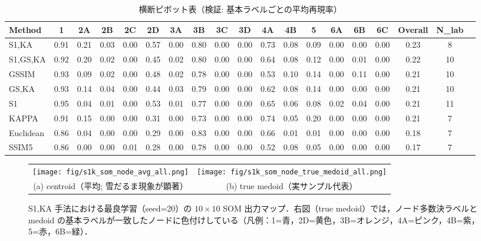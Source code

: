 \documentclass{jarticle}
\theoremstyle{definition}
\begin{document}
\begin{table*}[t!]
\centering
\caption{横断ピボット表（検証: 基本ラベルごとの平均再現率）}
\label{tab:pivot_valid}
\scriptsize
\setlength{\tabcolsep}{3pt}
\begin{tabular}{lcccccccccccccccccc}
\hline
Method & 1 & 2A & 2B & 2C & 2D & 3A & 3B & 3C & 3D & 4A & 4B & 5 & 6A & 6B & 6C & Overall & N\_lab \\
\hline
S1,KA      & 0.91 & 0.21 & 0.03 & 0.00 & 0.57 & 0.00 & 0.80 & 0.00 & 0.00 & 0.73 & 0.08 & 0.09 & 0.00 & 0.00 & 0.00 & 0.23 & 8 \\
S1,GS,KA   & 0.92 & 0.20 & 0.02 & 0.00 & 0.45 & 0.02 & 0.80 & 0.00 & 0.00 & 0.64 & 0.08 & 0.12 & 0.00 & 0.01 & 0.00 & 0.22 & 10 \\
GSSIM      & 0.93 & 0.09 & 0.02 & 0.00 & 0.48 & 0.02 & 0.78 & 0.00 & 0.00 & 0.53 & 0.10 & 0.14 & 0.00 & 0.11 & 0.00 & 0.21 & 10 \\
GS,KA      & 0.93 & 0.14 & 0.04 & 0.00 & 0.44 & 0.03 & 0.79 & 0.00 & 0.00 & 0.62 & 0.08 & 0.14 & 0.00 & 0.00 & 0.00 & 0.21 & 10 \\
S1         & 0.95 & 0.04 & 0.01 & 0.00 & 0.53 & 0.01 & 0.77 & 0.00 & 0.00 & 0.65 & 0.06 & 0.08 & 0.02 & 0.04 & 0.00 & 0.21 & 11 \\
KAPPA      & 0.91 & 0.15 & 0.00 & 0.00 & 0.31 & 0.00 & 0.73 & 0.00 & 0.00 & 0.74 & 0.05 & 0.20 & 0.00 & 0.00 & 0.00 & 0.21 & 7 \\
Euclidean  & 0.86 & 0.04 & 0.00 & 0.00 & 0.29 & 0.00 & 0.83 & 0.00 & 0.00 & 0.66 & 0.01 & 0.01 & 0.00 & 0.00 & 0.00 & 0.18 & 7 \\
SSIM5      & 0.86 & 0.00 & 0.00 & 0.01 & 0.28 & 0.00 & 0.78 & 0.00 & 0.00 & 0.52 & 0.08 & 0.05 & 0.00 & 0.00 & 0.00 & 0.17 & 7 \\
\hline
\end{tabular}
\end{table*}

\begin{figure*}[t!]
\centering
\begin{tabular}{cc}
\texttt{[image: fig/s1k\_som\_node\_avg\_all.png]} &
\texttt{[image: fig/s1k\_som\_node\_true\_medoid\_all.png]} \\
(a) centroid（平均; 雪だるま現象が顕著） & (b) true medoid（実サンプル代表） \\
\end{tabular}
\caption{S1,KA 手法における最良学習（seed=20）の $10\times 10$ SOM 出力マップ．右図（true medoid）では，ノード多数決ラベルと medoid の基本ラベルが一致したノードに色付けしている（凡例：1=青，2D=黄色，3B=オレンジ，4A=ピンク，4B=紫，5=赤，6B=緑）．}
\label{fig:s1k_maps}
\end{figure*}
\end{document}
